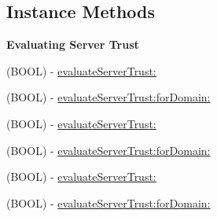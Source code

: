 \subsection*{Instance Methods}
\begin{Indent}\textbf{ Evaluating Server Trust}\par
{\em 

 

 }\begin{DoxyCompactItemize}
\item 
(B\+O\+OL) -\/ \mbox{\hyperlink{interface_a_f_security_policy_a404e83f245843cb7fd6408d5e9ee15e0}{evaluate\+Server\+Trust\+:}}
\item 
(B\+O\+OL) -\/ \mbox{\hyperlink{interface_a_f_security_policy_a892268d5a78bcf21d188486aca1aea56}{evaluate\+Server\+Trust\+:for\+Domain\+:}}
\item 
(B\+O\+OL) -\/ \mbox{\hyperlink{interface_a_f_security_policy_a404e83f245843cb7fd6408d5e9ee15e0}{evaluate\+Server\+Trust\+:}}
\item 
(B\+O\+OL) -\/ \mbox{\hyperlink{interface_a_f_security_policy_a892268d5a78bcf21d188486aca1aea56}{evaluate\+Server\+Trust\+:for\+Domain\+:}}
\item 
(B\+O\+OL) -\/ \mbox{\hyperlink{interface_a_f_security_policy_a404e83f245843cb7fd6408d5e9ee15e0}{evaluate\+Server\+Trust\+:}}
\item 
(B\+O\+OL) -\/ \mbox{\hyperlink{interface_a_f_security_policy_a892268d5a78bcf21d188486aca1aea56}{evaluate\+Server\+Trust\+:for\+Domain\+:}}
\end{DoxyCompactItemize}
\end{Indent}
